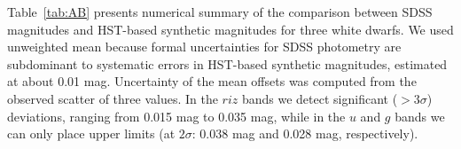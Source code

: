 \documentclass[fleqn,usenatbib]{mnras}
\begin{document}


Table~\ref{tab:AB} presents numerical summary of the comparison between SDSS magnitudes 
and HST-based synthetic magnitudes for three white dwarfs. We used unweighted mean because 
formal uncertainties for SDSS photometry are subdominant to systematic errors in HST-based
synthetic magnitudes, estimated at about 0.01 mag. Uncertainty of the mean offsets was 
computed from the observed scatter of three values. In the $riz$ bands we detect significant
($>3\sigma$) deviations, ranging from 0.015 mag to 0.035 mag, while in the $u$ and $g$ bands 
we can only place upper limits (at $2\sigma$: 0.038 mag and 0.028 mag, respectively). 

\end{document}
